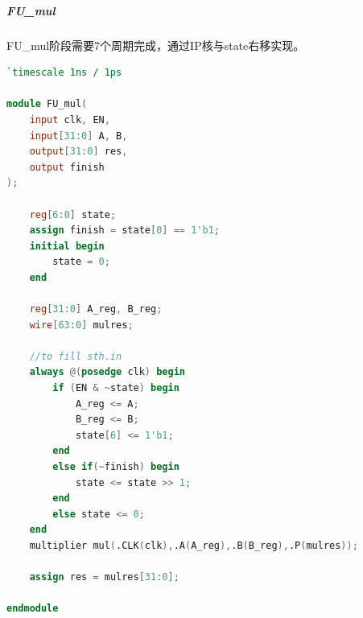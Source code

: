 \subparagraph{FU\_mul}
FU\_mul阶段需要7个周期完成，通过IP核与state右移实现。
\begin{lstlisting}[language = {verilog}]
	`timescale 1ns / 1ps

module FU_mul(
    input clk, EN,
    input[31:0] A, B,
    output[31:0] res,
    output finish
);

    reg[6:0] state;
    assign finish = state[0] == 1'b1;
    initial begin
        state = 0;
    end

    reg[31:0] A_reg, B_reg;
    wire[63:0] mulres;
    
    //to fill sth.in
    always @(posedge clk) begin
        if (EN & ~state) begin
            A_reg <= A;
            B_reg <= B;
            state[6] <= 1'b1;
        end
        else if(~finish) begin
            state <= state >> 1;
        end
        else state <= 0;
    end
    multiplier mul(.CLK(clk),.A(A_reg),.B(B_reg),.P(mulres));

    assign res = mulres[31:0];

endmodule
\end{lstlisting}
